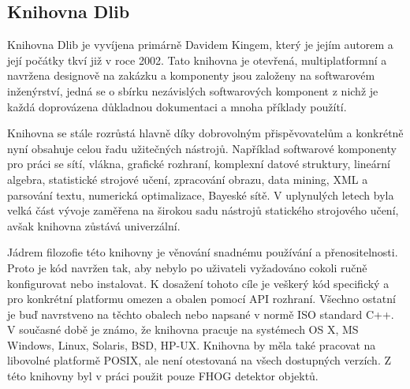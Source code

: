 \subsection{Knihovna Dlib}
Knihovna Dlib je vyvíjena primárně Davidem Kingem, který je jejím autorem a její počátky tkví již v roce 2002. Tato knihovna je otevřená, multiplatformní a navržena designově na zakázku a komponenty jsou založeny na softwarovém inženýrství, jedná se o sbírku nezávislých softwarových komponent z nichž je každá doprovázena důkladnou dokumentaci a mnoha příklady použítí.

Knihovna se stále rozrůstá hlavně díky dobrovolným přispěvovatelům a konkrétně nyní obsahuje celou řadu užitečných nástrojů. Například softwarové komponenty pro práci se sítí, vlákna, grafické rozhraní, komplexní datové struktury, lineární algebra, statistické strojové učení, zpracování obrazu, data mining, XML a parsování textu, numerická optimalizace, Bayeské sítě. V uplynulých letech byla velká část vývoje zaměřena na širokou sadu nástrojů statického strojového učení, avšak knihovna zůstává univerzální.  

Jádrem filozofie této knihovny je věnování snadnému používání a přenositelnosti. Proto je kód navržen tak, aby nebylo po uživateli vyžadováno cokoli ručně konfigurovat nebo instalovat. K dosažení tohoto cíle je veškerý kód specifický a pro konkrétní platformu omezen a obalen pomocí API rozhraní. Všechno ostatní je buď navrstveno na těchto obalech nebo napsané v normě ISO standard C++. V současné době je známo, že knihovna pracuje na systémech OS X, MS Windows, Linux, Solaris, BSD, HP-UX. Knihovna by měla také pracovat na libovolné platformě POSIX, ale není otestovaná na všech dostupných verzích. 
Z této knihovny byl v práci použit pouze FHOG detektor objektů.
